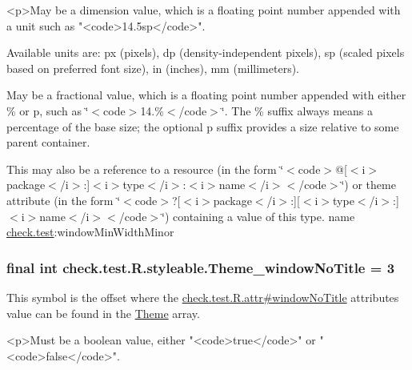 \begin{DoxyVerb}      <p>May be a dimension value, which is a floating point number appended with a unit such as "<code>14.5sp</code>".
\end{DoxyVerb}
 Available units are\+: px (pixels), dp (density-\/independent pixels), sp (scaled pixels based on preferred font size), in (inches), mm (millimeters). 

May be a fractional value, which is a floating point number appended with either \% or p, such as \char`\"{}$<$code$>$14.\%$<$/code$>$\char`\"{}. The \% suffix always means a percentage of the base size; the optional p suffix provides a size relative to some parent container. 

This may also be a reference to a resource (in the form \char`\"{}$<$code$>$@\mbox{[}$<$i$>$package$<$/i$>$\+:\mbox{]}$<$i$>$type$<$/i$>$\+:$<$i$>$name$<$/i$>$$<$/code$>$\char`\"{}) or theme attribute (in the form \char`\"{}$<$code$>$?\mbox{[}$<$i$>$package$<$/i$>$\+:\mbox{]}\mbox{[}$<$i$>$type$<$/i$>$\+:\mbox{]}$<$i$>$name$<$/i$>$$<$/code$>$\char`\"{}) containing a value of this type.  name \hyperlink{namespacecheck_1_1test}{check.\+test}\+:window\+Min\+Width\+Minor \hypertarget{classcheck_1_1test_1_1_r_1_1styleable_a565578f526c7a9432c574c995bc827e2}{}
\subsubsection[{Theme\+\_\+window\+No\+Title}]{\setlength{\rightskip}{0pt plus 5cm}final int check.\+test.\+R.\+styleable.\+Theme\+\_\+window\+No\+Title = 3\hspace{0.3cm}{\ttfamily [static]}}\label{classcheck_1_1test_1_1_r_1_1styleable_a565578f526c7a9432c574c995bc827e2}
This symbol is the offset where the \hyperlink{classcheck_1_1test_1_1_r_1_1attr_a29fbabdf31581c8b92ca157f7379b0c4}{check.\+test.\+R.\+attr\#window\+No\+Title} attribute\textquotesingle{}s value can be found in the \hyperlink{classcheck_1_1test_1_1_r_1_1styleable_acca726d02016a0cf607782ec3a436a81}{Theme} array.

\begin{DoxyVerb}      <p>Must be a boolean value, either "<code>true</code>" or "<code>false</code>".
\end{DoxyVerb}
 

